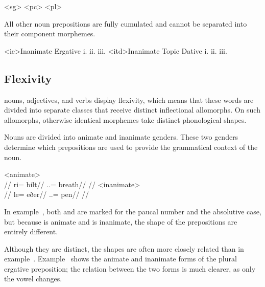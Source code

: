 	\a<sg>  
	\a<pc>  
	\a<pl>  
\xe

All other noun prepositions are fully cumulated and cannot be separated into their component morphemes.

	\a<ie>Inanimate Ergative
	\beginsubsub
		\b{i.}  
		\b{ii.}  
		\b{iii.}  
	\endsubsub
	\a<itd>Inanimate Topic Dative
	\beginsubsub
		\b{i.}  
		\b{ii.}  
		\b{iii.}  
	\endsubsub
\xe


\subsection{Flexivity}
\label{subsec:tvk-flexivity}

\langtvk{} nouns, adjectives, and verbs display flexivity, which means that these words are divided into separate classes that receive distinct inflectional allomorphs. On such allomorphs, otherwise identical morphemes take distinct phonological shapes.

Nouns are divided into animate and inanimate genders. These two genders determine which prepositions are used to provide the grammatical context of the noun.

	\a<animate>\begingl
		\glpreamble{}\\
		//
		\gla ri= bilt//
		\glb \An.\Pc.\Abs= breath//
		\glft {}//
	\endgl
	\a<inanimate>\begingl
		\glpreamble{}\\
		//
		\gla le= eðer//
		\glb \In.\Pc.\Abs= pen//
		\glft {}//
	\endgl
\xe

In example~, both  and  are marked for the paucal number and the absolutive case, but because  is animate and  is inanimate, the shape of the prepositions are entirely different.

Although they are distinct, the shapes are often more closely related than in example~. Example~ shows the animate and inanimate forms of the plural ergative preposition; the relation between the two forms is much clearer, as only the vowel changes.

